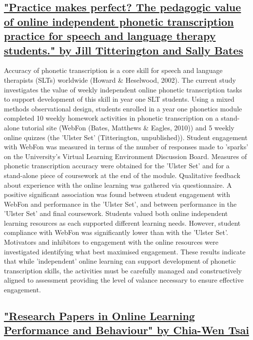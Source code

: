 \documentclass[sigchi]{acmart}
\begin{document}
		\subsection{\href{http://search.ebscohost.com.spot.lib.auburn.edu/login.aspx?direct=true&db=aph&AN=127784882&site=ehost-live}{"Practice makes perfect? The pedagogic value of online independent phonetic transcription practice for speech and language therapy students." by Jill Titterington and Sally Bates}}
			Accuracy of phonetic transcription is a core skill for speech and language therapists (SLTs) worldwide (Howard \& Heselwood, 2002). The current study investigates the value of weekly independent online phonetic transcription tasks to support development of this skill in year one SLT students. Using a mixed methods observational design, students enrolled in a year one phonetics module completed 10 weekly homework activities in phonetic transcription on a stand-alone tutorial site (WebFon (Bates, Matthews \& Eagles, 2010)) and 5 weekly online quizzes (the 'Ulster Set' (Titterington, unpublished)). Student engagement with WebFon was measured in terms of the number of responses made to 'sparks' on the University's Virtual Learning Environment Discussion Board. Measures of phonetic transcription accuracy were obtained for the 'Ulster Set' and for a stand-alone piece of coursework at the end of the module. Qualitative feedback about experience with the online learning was gathered via questionnaire. A positive significant association was found between student engagement with WebFon and performance in the 'Ulster Set', and between performance in the 'Ulster Set' and final coursework. Students valued both online independent learning resources as each supported different learning needs. However, student compliance with WebFon was significantly lower than with the 'Ulster Set'. Motivators and inhibitors to engagement with the online resources were investigated identifying what best maximised engagement. These results indicate that while 'independent' online learning can support development of phonetic transcription skills, the activities must be carefully managed and constructively aligned to assessment providing the level of valance necessary to ensure effective engagement.
		\subsection{\href{http://www.irrodl.org/index.php/irrodl/article/viewFile/2441/3603}{"Research Papers in Online Learning Performance and Behaviour" by Chia-Wen Tsai}}
\end{document}
